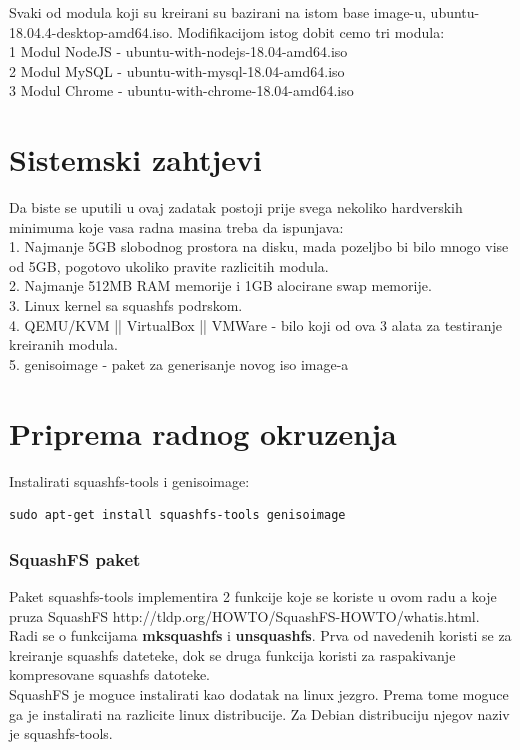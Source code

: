 \documentclass[12pt,vi]{mitthesis}
\begin{document}
Svaki od modula koji su kreirani su bazirani na istom base image-u, ubuntu-18.04.4-desktop-amd64.iso. Modifikacijom istog dobit cemo tri modula:\\ 
1 Modul NodeJS - ubuntu-with-nodejs-18.04-amd64.iso\\
2 Modul MySQL - ubuntu-with-mysql-18.04-amd64.iso\\
3 Modul Chrome - ubuntu-with-chrome-18.04-amd64.iso\\

\chapter*{Sistemski zahtjevi}
Da biste se uputili u ovaj zadatak postoji prije svega nekoliko hardverskih minimuma koje vasa radna masina treba da ispunjava:\\

1. Najmanje 5GB slobodnog prostora na disku, mada pozeljbo bi bilo mnogo vise od 5GB, pogotovo ukoliko pravite razlicitih modula.\\
2. Najmanje 512MB RAM memorije i 1GB alocirane swap memorije.\\
3. Linux kernel sa squashfs podrskom.\\
4. QEMU/KVM || VirtualBox || VMWare - bilo koji od ova 3 alata za testiranje kreiranih modula.\\
5. genisoimage - paket za generisanje novog iso image-a\\

\chapter*{Priprema radnog okruzenja}
Instalirati squashfs-tools i genisoimage:
\begin{lstlisting}[style=BashInputStyle]
sudo apt-get install squashfs-tools genisoimage
\end{lstlisting}

\subsection*{SquashFS paket}
Paket squashfs-tools implementira 2 funkcije koje se koriste u ovom radu a koje pruza SquashFS http://tldp.org/HOWTO/SquashFS-HOWTO/whatis.html.
Radi se o funkcijama \textbf{mksquashfs} i \textbf{unsquashfs}. Prva od navedenih koristi se za kreiranje squashfs dateteke, dok se druga funkcija koristi za raspakivanje kompresovane squashfs datoteke.\\
SquashFS je moguce instalirati kao dodatak na linux jezgro. Prema tome moguce ga je instalirati na razlicite linux distribucije. Za Debian distribuciju njegov naziv je squashfs-tools.
\end{document}
